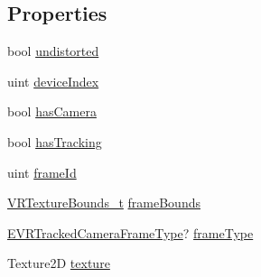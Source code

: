 \subsection*{Properties}
\begin{DoxyCompactItemize}
\item 
bool \mbox{\hyperlink{class_valve_1_1_v_r_1_1_steam_v_r___tracked_camera_1_1_video_stream_texture_a56cd0bedd92d337384c2639142df95cd}{undistorted}}
\item 
uint \mbox{\hyperlink{class_valve_1_1_v_r_1_1_steam_v_r___tracked_camera_1_1_video_stream_texture_a6ea68ffe28dad910b43405c79984322a}{device\+Index}}
\item 
bool \mbox{\hyperlink{class_valve_1_1_v_r_1_1_steam_v_r___tracked_camera_1_1_video_stream_texture_a8fd8e16114a8681647aeb2964909315c}{has\+Camera}}
\item 
bool \mbox{\hyperlink{class_valve_1_1_v_r_1_1_steam_v_r___tracked_camera_1_1_video_stream_texture_ac8281d66d7d4493e2f5d609b8941af96}{has\+Tracking}}
\item 
uint \mbox{\hyperlink{class_valve_1_1_v_r_1_1_steam_v_r___tracked_camera_1_1_video_stream_texture_ad013fa644d9e02a03ccdeadd80be453b}{frame\+Id}}
\item 
\mbox{\hyperlink{struct_valve_1_1_v_r_1_1_v_r_texture_bounds__t}{V\+R\+Texture\+Bounds\+\_\+t}} \mbox{\hyperlink{class_valve_1_1_v_r_1_1_steam_v_r___tracked_camera_1_1_video_stream_texture_a675f3adde27a60678ca35599c4b9d416}{frame\+Bounds}}
\item 
\mbox{\hyperlink{namespace_valve_1_1_v_r_a9962211bc3fe98c2683db188c12c9afd}{E\+V\+R\+Tracked\+Camera\+Frame\+Type}}? \mbox{\hyperlink{class_valve_1_1_v_r_1_1_steam_v_r___tracked_camera_1_1_video_stream_texture_a0571a50693bd722c576c14cd0f09c329}{frame\+Type}}
\item 
Texture2D \mbox{\hyperlink{class_valve_1_1_v_r_1_1_steam_v_r___tracked_camera_1_1_video_stream_texture_aac563079d0750582456a1b4c033296e5}{texture}}

\end{DoxyCompactItemize}
